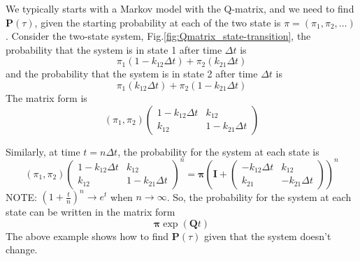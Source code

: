 We typically starts with a Markov model with the Q-matrix, and we need to find
$\mathbf{P}(\tau)$, given the starting probability at
each of the two state is $\pi=(\pi_1,\pi_2,\ldots)$. Consider the two-state
system, Fig.\ref{fig:Qmatrix_state-transition}, the probability that the system
is in state 1 after time $\Delta t$ is
\begin{equation}
\pi_1(1-k_{12}\Delta t) + \pi_2(k_{21}\Delta t)
\end{equation}
and the probability that the system is in state 2 after time $\Delta t$ is
\begin{equation}
\pi_1(k_{12}\Delta t) + \pi_2 (1-k_{21}\Delta t)
\end{equation}
The matrix form is
\begin{equation}
\left(\pi_1, \pi_2\right) \left(\begin{array}{cc} 1-k_{12}\Delta t & k_{12} \\
k_{12} & 1-k_{21}\Delta t
\end{array}
\right)
\end{equation}


Similarly, at time $t=n\Delta t$, the probability for the system at each state
is
\begin{equation}
\left(\pi_1, \pi_2\right) \left(\begin{array}{cc} 1-k_{12}\Delta t & k_{12} \\
k_{12} & 1-k_{21}\Delta t
\end{array}
\right)^n
= \mathbf{\pi} \left(\mathbf{I} + \left(\begin{array}{cc} -k_{12}\Delta t &
k_{12}
\\
k_{21} & -k_{21}\Delta t\end{array} \right) \right)^n
\end{equation}
NOTE: $(1+\frac{t}{n})^n \rightarrow e^t$ when $n\rightarrow \infty$. So, the
probability for the system at each state can be written in the matrix form
\begin{equation}
\mathbf{\pi} \exp(\mathbf{Q}t)
\end{equation}
The above example shows how to find $\mathbf{P}(\tau)$ given that the system
doesn't change.

